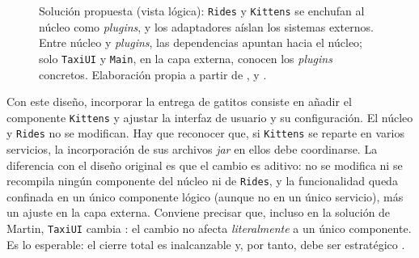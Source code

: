 \begin{figure}[!t]
{%
  }
  \caption{Solución propuesta (vista lógica): \texttt{Rides} y \texttt{Kittens} se enchufan
           al núcleo como \emph{plugins}, y los adaptadores aíslan los sistemas externos.
           Entre núcleo y \emph{plugins}, las dependencias apuntan hacia el núcleo; solo
           \texttt{TaxiUI} y \texttt{Main}, en la capa externa, conocen los \emph{plugins}
           concretos. Elaboración propia a partir de
           \textcite[205, 232, 237, 244--246]{martin2017}, \textcite{cockburn2005} y
           \textcite[21--23]{richards2015}.}
  \label{fig:p5-solucion}
\end{figure}

Con este diseño, incorporar la entrega de gatitos consiste en añadir el componente
\texttt{Kittens} y ajustar la interfaz de usuario y su configuración. El núcleo y
\texttt{Rides} no se modifican. Hay que reconocer que, si \texttt{Kittens} se reparte en
varios servicios, la incorporación de sus archivos \emph{jar} en ellos debe coordinarse.
La diferencia con el diseño original es que el cambio es aditivo: no se modifica ni se
recompila ningún componente del núcleo ni de \texttt{Rides}, y la funcionalidad queda
confinada en un único componente lógico (aunque no en un único servicio), más un ajuste
en la capa externa. Conviene precisar que, incluso en la solución de Martin,
\texttt{TaxiUI} cambia \parencite[244]{martin2017}: el cambio no afecta
\emph{literalmente} a un único componente. Es lo esperable: el cierre total es
inalcanzable y, por tanto, debe ser estratégico \parencite[106]{martin2017}.

